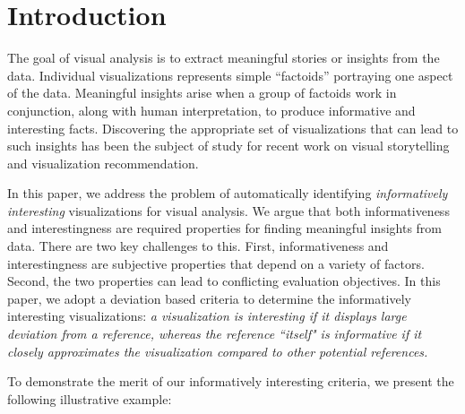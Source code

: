 \section{Introduction}
\par The goal of visual analysis is to extract meaningful stories or insights from the data. Individual visualizations represents simple ``factoids'' portraying one aspect of the data. Meaningful insights arise when a group of factoids work in conjunction, along with human interpretation, to produce informative and interesting facts. Discovering the appropriate set of visualizations that can lead to such insights has been the subject of study for recent work on visual storytelling\cite{Kim2017,Hullman2017,Segel2010,Hullman2013} and visualization recommendation\cite{Vartak2015}. 


In this paper, we address the problem of automatically identifying \emph{informatively interesting} visualizations for visual analysis. We argue that both informativeness and interestingness are required properties for finding meaningful insights from data. There are two key challenges to this. First, informativeness and interestingness are subjective properties that depend on a variety of factors. Second, the two properties can lead to conflicting evaluation objectives. In this paper, we adopt a deviation based criteria to determine the informatively interesting visualizations: \emph{a visualization is interesting if it displays large deviation from a reference, whereas the reference ``itself" is informative if it closely approximates the visualization compared to other potential references.} 

To demonstrate the merit of our informatively interesting criteria, we present the following illustrative example: 


